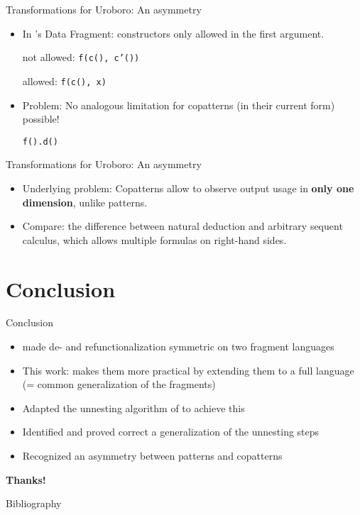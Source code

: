 \documentclass[xcolor=svgnames]{beamer}
\begin{document}

\begin{frame}
  {Transformations for Uroboro: An asymmetry}
  \begin{itemize}
    \item In \citeauthor{rendel15automatic}'s Data Fragment: constructors only allowed in the first argument.

      not allowed: \texttt{f(c(), c'())}

      allowed: \texttt{f(c(), x)}

  \item Problem: No analogous limitation for copatterns (in their current form) possible!

      \texttt{f().d()}
  \end{itemize}
\end{frame}

\begin{frame}
  {Transformations for Uroboro: An asymmetry}
  \begin{itemize}
    \item Underlying problem: Copatterns allow to observe output usage in \textbf{only one dimension}, unlike patterns.

    \item Compare: the difference between natural deduction and arbitrary sequent calculus, which allows multiple formulas on right-hand sides.
  \end{itemize}
\end{frame}

\section{Conclusion}

\begin{frame}
  {Conclusion}
  \begin{itemize}
    \item \citet{rendel15automatic} made de- and refunctionalization symmetric on two fragment languages
    \item This work: makes them more practical by extending them to a full language (= common generalization of the fragments)
    \item Adapted the unnesting algorithm of \citet{setzer14unnesting} to achieve this
    \item Identified and proved correct a generalization of the unnesting steps
    \item Recognized an asymmetry between patterns and copatterns
  \end{itemize}

  \centering\textbf{Thanks!}
\end{frame}

\begin{frame}%
  {Bibliography}
  
  \tiny
\end{frame}
\end{document}
